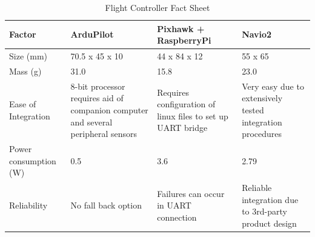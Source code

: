  \begin{table}[H]
            \centering
            \caption{Flight Controller Fact Sheet}
            \label{tab: flight controller}
            \begin{tabularx}{1\linewidth}{X X X X}
                \toprule
                Factor & ArduPilot & Pixhawk + RaspberryPi & Navio2 \\
               \midrule
                Size (mm) & 70.5 x 45 x 10 & 44 x 84 x 12 & 55 x 65 \\
                Mass (g) & 31.0 & 15.8 & 23.0 \\
                Ease of Integration & 8-bit processor requires aid of companion \mbox{computer} and several peripheral sensors & Requires configuration of linux files to set up UART bridge & Very easy due to extensively tested integration procedures\\
                Power \newline consumption (W) & 0.5 & 3.6 & 2.79 \\
                Reliability & No fall back option & Failures can occur in UART connection & Reliable integration due to 3rd-party product \mbox{design} \\
                \bottomrule
            \end{tabularx}
        \end{table}
